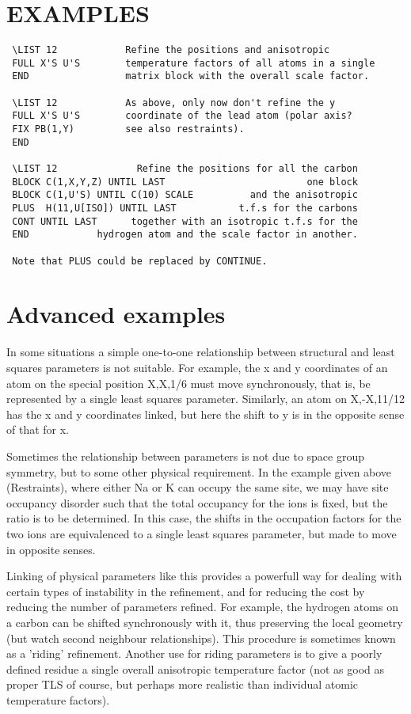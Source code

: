 \documentclass[10pt,a4paper]{report}
\begin{document}
\section{EXAMPLES}
\small\begin{verbatim}
 \LIST 12            Refine the positions and anisotropic 
 FULL X'S U'S        temperature factors of all atoms in a single
 END                 matrix block with the overall scale factor.
 
 \LIST 12            As above, only now don't refine the y 
 FULL X'S U'S        coordinate of the lead atom (polar axis? 
 FIX PB(1,Y)         see also restraints).
 END
 
 \LIST 12              Refine the positions for all the carbon 
 BLOCK C(1,X,Y,Z) UNTIL LAST                         one block
 BLOCK C(1,U'S) UNTIL C(10) SCALE          and the anisotropic 
 PLUS  H(11,U[ISO]) UNTIL LAST           t.f.s for the carbons 
 CONT UNTIL LAST      together with an isotropic t.f.s for the
 END            hydrogen atom and the scale factor in another. 
 
 Note that PLUS could be replaced by CONTINUE.
\end{verbatim}\normalsize


\section{Advanced examples}


In some situations a simple one-to-one relationship between structural and
 least squares parameters is not suitable. For example, the x and y coordinates
 of an atom on the special position X,X,1/6 must move synchronously, that is,
 be represented by a single least squares parameter. Similarly, an atom on
 X,-X,11/12 has the x and y coordinates linked, but here the shift to y is in
 the opposite sense of that for x.


Sometimes the relationship between parameters is not due to space group
 symmetry, but to some other physical requirement. In the example given above
 (Restraints),
 where either Na or K can occupy the same site, we may have site occupancy
 disorder such that the total occupancy for the ions is fixed, but the ratio
 is to be determined. In this case, the shifts in the occupation
 factors for the two ions are equivalenced to a single least squares parameter,
 but made to move in opposite senses.


Linking of physical parameters like this provides a powerfull way for
 dealing with certain types of instability in the refinement, and for reducing
 the cost by reducing the number of parameters refined. For example, the
 hydrogen atoms on a carbon can be shifted synchronously with it, thus 
 preserving the local geometry (but watch second neighbour relationships).
 This procedure is sometimes known as a 'riding' refinement. Another use
 for riding parameters is to give a poorly defined residue a single overall
 anisotropic temperature factor (not as good as proper TLS of course, but
 perhaps more realistic than individual atomic temperature factors).
\end{document}
